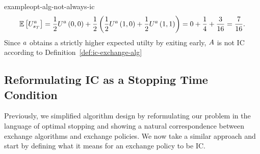 \begin{restatable}{example}{opt-alg-not-always-ic}
    \begin{align*}
        \mathbb{E}\left[
            U^a_{
                s_{
                    T
                }
            }
        \right]
        =
        \frac{1}{2}U^a\left(0,0\right)
        +
        \frac{1}{2}\left(
            \frac{1}{2}U^a\left(1,0\right)
            +
            \frac{1}{2}U^a\left(1,1\right)
        \right)
        =
        0 + \frac{1}{4}+\frac{3}{16}
        =
        \frac{7}{16} .
    \end{align*}  
    Since $a$ obtains a strictly higher expected utilty by exiting early, $A$ is not IC 
    according to Definition~\ref{def:ic-exchange-alg}
\end{restatable}  

\subsection{Reformulating IC as a Stopping Time Condition}

Previously, we simplified algorithm design by reformulating our problem in the language of optimal 
stopping and showing a natural correspondence between exchange algorithms and exchange policies. 
We now take a similar approach and start by defining what it means for an exchange policy to be IC.

